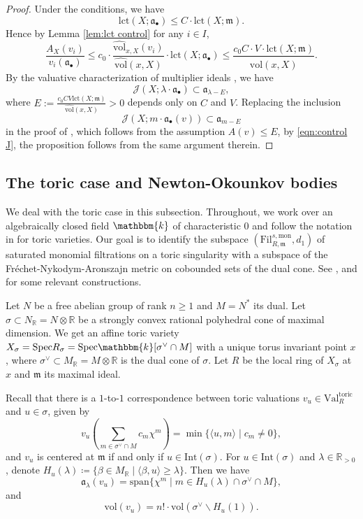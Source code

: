 \documentclass[11pt, leqno]{amsart}%
\theoremstyle{plain}
\theoremstyle{definition}
\theoremstyle{remark}
\newcommand{\cJ}{\mathcal{J}}
\newcommand{\bR}{\mathbb{R}}
\newcommand{\fa}{\mathfrak{a}}
\newcommand{\fm}{\mathfrak{m}}
\newcommand{\vol}{\mathrm{vol}}
\newcommand{\lct}{\mathrm{lct}}
\newcommand{\Int}{\mathrm{Int}}
\newcommand{\Val}{\mathrm{Val}}
\newcommand{\nvol}{\widehat{\mathrm{vol}}}
\newcommand{\Spec}{\mathrm{Spec}}
\newcommand{\bk}{\mathbbm{k}}
\newcommand{\Fil}{\mathrm{Fil}}
\numberwithin{equation}{section}
\begin{document}
\begin{proof}
    Under the conditions, we have
    \[
        \lct(X;\fa_\bullet)\le C\cdot\lct(X;\fm).
    \]
    Hence by Lemma \ref{lem:lct control} for any $i\in I$,
    \[
        \frac{A_X(v_i)}{v_i(\fa_\bullet)}\le c_0\cdot \frac{\nvol_{x,X}(v_i)}{\nvol(x,X)}\cdot\lct(X;\fa_\bullet)\le \frac{c_0C\cdot V\cdot \lct(X;\fm)}{\nvol(x,X)}.
    \]
    By the valuative characterization of multiplier ideals \cite[Theorem 1.2]{BdFFU15}, we have 
    \begin{equation}\label{eqn:control J}
        \cJ(X;\lambda\cdot\fa_\bullet)\subset \fa_{\lambda-E},
    \end{equation}
    where $E:=\frac{c_0CV\lct(X;\fm)}{\nvol(x,X)}>0$ depends only on $C$ and $V$. Replacing the inclusion
    \[
        \cJ(X;m\cdot\fa_\bullet(v))\subset \fa_{m-E}
    \]
    in the proof of \cite[Proposition 3.7]{Blu18}, which follows from the assumption $A(v)\le E$, by \eqref{eqn:control J}, the proposition follows from the same argument therein.
\end{proof}



\subsection{The toric case and Newton-Okounkov bodies}\label{ssec:toric}

We deal with the toric case in this subsection. Throughout, we work over an algebraically closed field $\bk$ of characteristic $0$ and follow the notation in \cite{Ful93} for toric varieties. Our goal is to identify the subspace $(\Fil^{s,\mathrm{mon}}_{R,\fm},d_1)$ of saturated monomial filtrations on a toric singularity with a subspace of the Fr\'echet-Nykodym-Aronszajn metric on cobounded sets of the dual cone. See \cite[Section 8]{JM12}, \cite[Section 6]{KK14} and \cite[Section 8]{Blu18} for some relevant constructions. 

Let $N$ be a free abelian group of rank $n\ge 1$ and $M=N^*$ its dual. Let $\sigma\subset N_\bR=N\otimes \bR$ be a strongly convex rational polyhedral cone of maximal dimension. We get an affine toric variety $X_\sigma=\Spec R_\sigma=\Spec \bk[\sigma^\vee\cap M]$ with a unique torus invariant point $x$, where $\sigma^\vee\subset M_\bR=M\otimes\bR$ is the dual cone of $\sigma$. Let $R$ be the local ring of $X_\sigma$ at $x$ and $\fm$ its maximal ideal. 

Recall that there is a $1$-to-$1$ correspondence between toric valuations $v_u\in\Val^{\mathrm{toric}}_R$ and $u\in\sigma$, given by 
\[
    v_u(\sum_{m\in\sigma^\vee\cap M}c_m\chi^m)=\min\{\langle u,m\rangle\mid c_m\ne 0\},
\]
and $v_u$ is centered at $\fm$ if and only if $u\in\Int(\sigma)$. For $u\in\Int(\sigma)$ and $\lambda\in\bR_{>0}$, denote $H_u(\lambda)\coloneqq \{\beta\in M_\bR\mid \langle \beta,u \rangle\ge \lambda\}$. Then we have 
\[
    \fa_\lambda(v_u)=\mathrm{span}\{\chi^m\mid m\in H_u(\lambda)\cap\sigma^\vee\cap M\},
\]
and
\[
    \vol(v_u)=n!\cdot \vol(\sigma^\vee\backslash H_u(1)).
\]
\end{document}

